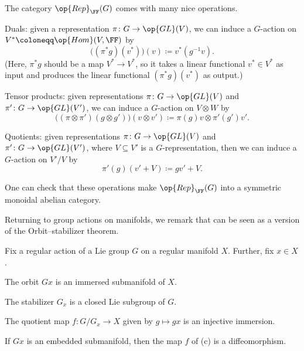 \documentclass[../notes.tex]{subfiles}
\begin{document}
\begin{remark}
	The category $\op{Rep}_{\FF}(G)$ comes with many nice operations.
	\begin{listalph}
		\item Duals: given a representation $\pi\colon G\to\op{GL}(V)$, we can induce a $G$-action on $V^*\coloneqq\op{Hom}(V,\FF)$ by
		\[\big((\pi^*g)(v^*)\big)(v)\coloneqq v^*\left(g^{-1}v\right).\]
		(Here, $\pi^*g$ should be a map $V^*\to V^*$, so it takes a linear functional $v^*\in V^*$ as input and produces the linear functional $(\pi^*g)(v^*)$ as output.)
		\item Tensor products: given representations $\pi\colon G\to\op{GL}(V)$ and $\pi'\colon G\to\op{GL}(V')$, we can induce a $G$-action on $V\otimes W$ by
		\[\big((\pi\otimes\pi')(g\otimes g')\big)(v\otimes v')\coloneqq\pi(g)v\otimes\pi'(g')v'.\]
		\item Quotients: given representations $\pi\colon G\to\op{GL}(V)$ and $\pi'\colon G\to\op{GL}(V')$, where $V\subseteq V'$ is a $G$-representation, then we can induce a $G$-action on $V'/V$ by
		\[\pi'(g)(v'+V)\coloneqq gv'+V.\]
	\end{listalph}
	One can check that these operations make $\op{Rep}_{\FF}(G)$ into a symmetric monoidal abelian category.
\end{remark}
Returning to group actions on manifolds, we remark that  can be seen as a version of the Orbit--stabilizer theorem.
\begin{theorem}
	Fix a regular action of a Lie group $G$ on a regular manifold $X$. Further, fix $x\in X$.
	\begin{listalph}
		\item The orbit $Gx$ is an immersed submanifold of $X$.
		\item The stabilizer $G_x$ is a closed Lie subgroup of $G$.
		\item The quotient map $f\colon G/G_x\to X$ given by $g\mapsto gx$ is an injective immersion.
		\item If $Gx$ is an embedded submanifold, then the map $f$ of (c) is a diffeomorphism.
	\end{listalph}
\end{theorem}
\end{document}
